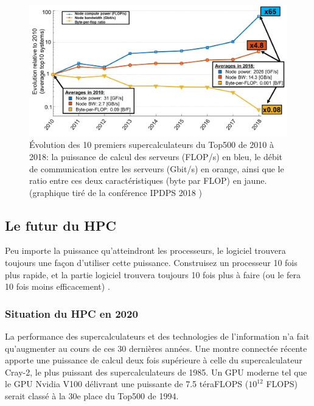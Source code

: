             \begin{figure}             \center             \includegraphics[width=12cm]{images/unbalance_flop_io.png}             \caption{\label{fig:unbalance_flop_io}Évolution des 10 premiers supercalculateurs du Top500 de 2010 à 2018: la puissance de calcul des serveurs (FLOP/s) en bleu, le débit de communication entre les serveurs (Gbit/s) en orange, ainsi que le ratio entre ces deux caractéristiques (byte par \gls{FLOP}) en jaune. (graphique tiré de la conférence IPDPS 2018 \cite{Bergman2018})}             \end{figure}
 
 
\subsection{Le futur du HPC}


    \begin{fancyquotes}
    Peu importe la puissance qu'atteindront les processeurs, le logiciel trouvera toujours une façon d'utiliser cette puissance. Construisez un processeur 10 fois plus rapide, et la partie logiciel trouvera toujours 10 fois plus à faire (ou le fera 10 fois moins efficacement)  \cite{Sutter2005}.
    \end{fancyquotes}
 
    \subsubsection{Situation du HPC en 2020}

   
        
        La performance des supercalculateurs et des technologies de l'information n'a fait qu'augmenter au cours de ces 30 dernières années. Une montre connectée récente apporte une puissance de calcul deux fois supérieure à celle du supercalculateur Cray-2, le plus puissant des supercalculateurs de 1985. Un GPU moderne tel que le GPU Nvidia V100 délivrant une puissante de 7.5 téraFLOPS ($10^{12}$ \gls{FLOPS}) serait classé à la 30e place du Top500 de 1994.

